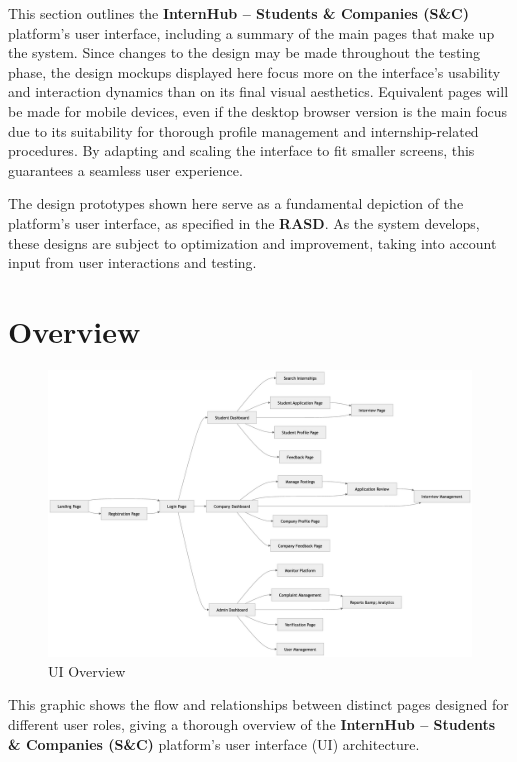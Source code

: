 This section outlines the \textbf{InternHub – Students \& Companies (S\&C)} platform's user interface, including a summary of the main pages that make up the system. Since changes to the design may be made throughout the testing phase, the design mockups displayed here focus more on the interface's usability and interaction dynamics than on its final visual aesthetics. Equivalent pages will be made for mobile devices, even if the desktop browser version is the main focus due to its suitability for thorough profile management and internship-related procedures. By adapting and scaling the interface to fit smaller screens, this guarantees a seamless user experience.

The design prototypes shown here serve as a fundamental depiction of the platform's user interface, as specified in the \textbf{RASD}. As the system develops, these designs are subject to optimization and improvement, taking into account input from user interactions and testing.

\section{Overview}
\label{sec:overview}%
\begin{figure}[H]
    \begin{center}
        \includegraphics[width=0.82\linewidth]{JhaBhatiaSharma/imagesDD/UIOverview.png}
        \caption{UI Overview}
        \label{fig:uiOverview}
    \end{center}
\end{figure}

This graphic shows the flow and relationships between distinct pages designed for different user roles, giving a thorough overview of the \textbf{InternHub – Students \& Companies (S\&C)} platform's user interface (UI) architecture. 

